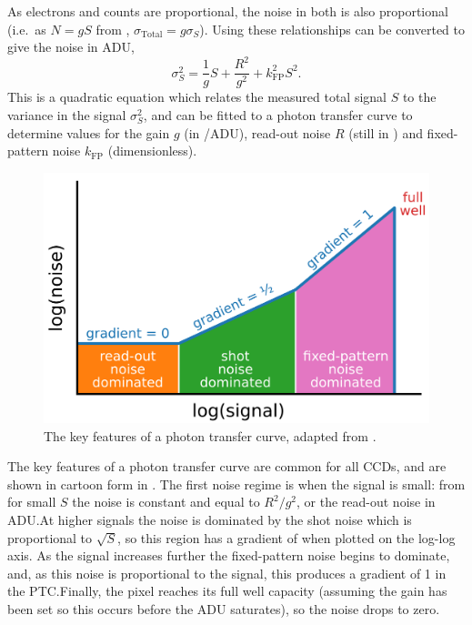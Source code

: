 \begin{colsection}
As electrons and counts are proportional, the noise in both is also proportional (i.e.\ as $N=gS$ from ,  $\sigma_\text{Total} = g\sigma_S$). Using these relationships  can be converted to give the noise in ADU,
%
\begin{equation}
    \sigma_S^2 = \frac{1}{g} S + \frac{R^2}{g^2} + k_\text{FP}^2 S^2.
    \label{eq:ptc}
\end{equation}
%
This is a quadratic equation which relates the measured total signal $S$ to the variance in the signal $\sigma_S^2$, and can be fitted to a photon transfer curve to determine values for the gain $g$ (in \elec/ADU), read-out noise $R$ (still in \elec{}) and fixed-pattern noise $k_\text{FP}$ (dimensionless).

\begin{figure}[t]
    \begin{center}
        \includegraphics[width=0.8\linewidth]{images/ptc.pdf}
    \end{center}
    \caption[Key features of the photon transfer curve]{
        The key features of a photon transfer curve, adapted from \citet{CCDs}.
    }\label{fig:ptc_cartoon}
\end{figure}

The key features of a photon transfer curve are common for all CCDs, and are shown in cartoon form in . The first noise regime is when the signal is small: from  for small $S$ the noise is constant and equal to $R^2/g^2$, or the read-out noise in ADU.\@ At higher signals the noise is dominated by the shot noise which is proportional to $\sqrt{S}$, so this region has a gradient of  when plotted on the log-log axis. As the signal increases further the fixed-pattern noise begins to dominate, and, as this noise is proportional to the signal, this produces a gradient of 1 in the PTC.\@ Finally, the pixel reaches its full well capacity (assuming the gain has been set so this occurs before the ADU saturates), so the noise drops to zero.


\end{colsection}
